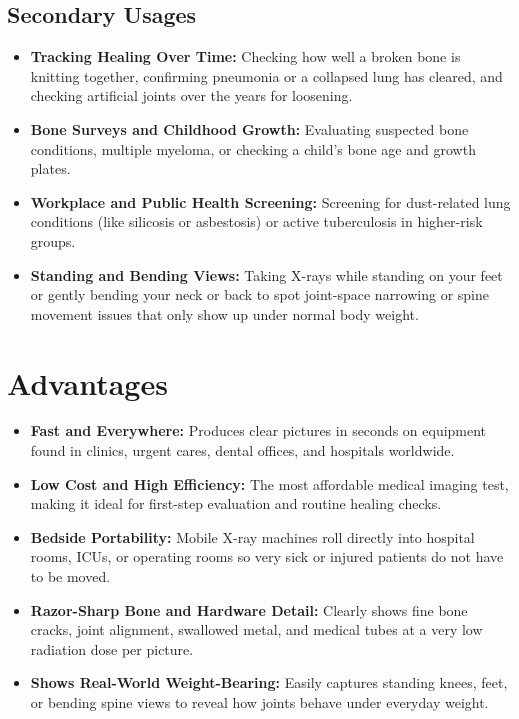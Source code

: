 \subsection{Secondary Usages}

\begin{itemize}
    \item \textbf{Tracking Healing Over Time:} Checking how well a broken bone is knitting together, confirming pneumonia or a collapsed lung has cleared, and checking artificial joints over the years for loosening.
    \item \textbf{Bone Surveys and Childhood Growth:} Evaluating suspected bone conditions, multiple myeloma, or checking a child's bone age and growth plates.
    \item \textbf{Workplace and Public Health Screening:} Screening for dust-related lung conditions (like silicosis or asbestosis) or active tuberculosis in higher-risk groups.
    \item \textbf{Standing and Bending Views:} Taking X-rays while standing on your feet or gently bending your neck or back to spot joint-space narrowing or spine movement issues that only show up under normal body weight.
\end{itemize}

\section{Advantages}

\begin{itemize}
    \item \textbf{Fast and Everywhere:} Produces clear pictures in seconds on equipment found in clinics, urgent cares, dental offices, and hospitals worldwide.
    \item \textbf{Low Cost and High Efficiency:} The most affordable medical imaging test, making it ideal for first-step evaluation and routine healing checks.
    \item \textbf{Bedside Portability:} Mobile X-ray machines roll directly into hospital rooms, ICUs, or operating rooms so very sick or injured patients do not have to be moved.
    \item \textbf{Razor-Sharp Bone and Hardware Detail:} Clearly shows fine bone cracks, joint alignment, swallowed metal, and medical tubes at a very low radiation dose per picture.
    \item \textbf{Shows Real-World Weight-Bearing:} Easily captures standing knees, feet, or bending spine views to reveal how joints behave under everyday weight.
\end{itemize}

